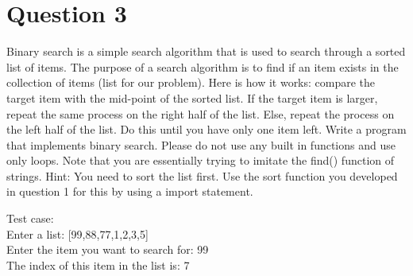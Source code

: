 \documentclass[11pt,a4paper]{article}
\begin{document}
\section*{Question 3}
Binary search is a simple search algorithm that is used to search through a sorted list of items. The purpose of a search algorithm is to find if an item exists in the collection of items (list for our problem). Here is how it works: compare the target item with the mid-point of the sorted list. If the target item is larger, repeat the same process on the right half of the list. Else, repeat the process on the left half of the list. Do this until you have only one item left. Write a program that implements binary search. Please do not use any built in functions and use only loops. Note that you are essentially trying to imitate the find() function of strings. Hint: You need to sort the list first. Use the sort function you developed in question 1 for this by using a import statement.

\medskip Test case: 
\\ Enter a list: [99,88,77,1,2,3,5]
\\ Enter the item you want to search for: 99
\\ The index of this item in the list is: 7
\end{document}
